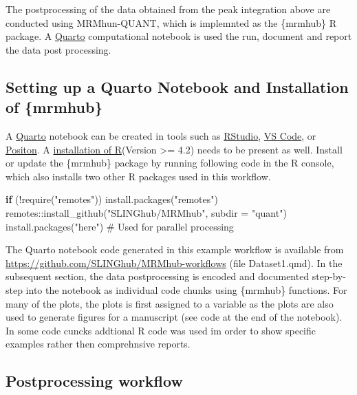 \documentclass[
  letterpaper,
  DIV=11,
  numbers=noendperiod]{scrartcl}
\newenvironment{Shaded}{\begin{snugshade}}{\end{snugshade}}
\newcommand{\AttributeTok}[1]{\textcolor[rgb]{0.40,0.45,0.13}{#1}}
\newcommand{\CommentTok}[1]{\textcolor[rgb]{0.37,0.37,0.37}{#1}}
\newcommand{\ControlFlowTok}[1]{\textcolor[rgb]{0.00,0.23,0.31}{\textbf{#1}}}
\newcommand{\FunctionTok}[1]{\textcolor[rgb]{0.28,0.35,0.67}{#1}}
\newcommand{\NormalTok}[1]{\textcolor[rgb]{0.00,0.23,0.31}{#1}}
\newcommand{\SpecialCharTok}[1]{\textcolor[rgb]{0.37,0.37,0.37}{#1}}
\newcommand{\StringTok}[1]{\textcolor[rgb]{0.13,0.47,0.30}{#1}}
\begin{document}
The postprocessing of the data obtained from the peak integration above
are conducted using MRMhun-QUANT, which is implemnted as the \{mrmhub\}
R package. A \href{https://quarto.org/}{Quarto} computational notebook
is used the run, document and report the data post processing.

\subsection{Setting up a Quarto Notebook and Installation of
\{mrmhub\}}\label{setting-up-a-quarto-notebook-and-installation-of-mrmhub}

A \href{https://quarto.org/}{Quarto} notebook can be created in tools
such as \href{https://posit.co/download/rstudio-desktop/}{RStudio},
\href{https://code.visualstudio.com}{VS Code}, or
\href{https://positron.posit.co}{Positon}. A
\href{https://cran.r-project.org}{installation of R}(Version
\textgreater= 4.2) needs to be present as well. Install or update the
\{mrmhub\} package by running following code in the R console, which
also installs two other R packages used in this workflow.

\begin{Shaded}
\begin{Highlighting}[]
\ControlFlowTok{if}\NormalTok{ (}\SpecialCharTok{!}\FunctionTok{require}\NormalTok{(}\StringTok{"remotes"}\NormalTok{)) }\FunctionTok{install.packages}\NormalTok{(}\StringTok{"remotes"}\NormalTok{)}
\NormalTok{remotes}\SpecialCharTok{::}\FunctionTok{install\_github}\NormalTok{(}\StringTok{"SLINGhub/MRMhub"}\NormalTok{, }\AttributeTok{subdir =} \StringTok{"quant"}\NormalTok{)}
\FunctionTok{install.packages}\NormalTok{(}\StringTok{"here"}\NormalTok{) }\CommentTok{\# Used for parallel processing}
\end{Highlighting}
\end{Shaded}

The Quarto notebook code generated in this example workflow is available
from \url{https://github.com/SLINGhub/MRMhub-workflows} (file
Dataset1.qmd). In the subsequent section, the data postprocessing is
encoded and documented step-by-step into the notebook as individual code
chunks using \{mrmhub\} functions. For many of the plots, the plots is
first assigned to a variable as the plots are also used to generate
figures for a manuscript (see code at the end of the notebook). In some
code cuncks addtional R code was used im order to show specific examples
rather then comprehnsive reports.

\subsection{Postprocessing workflow}\label{postprocessing-workflow}
\end{document}
